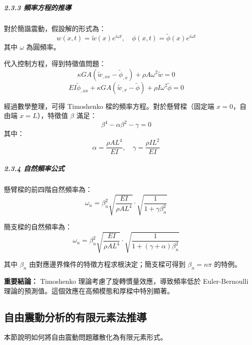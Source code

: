 ﻿\documentclass[UTF8, a4paper, 12pt]{ctexart}
\begin{document}
\subparagraph{2.3.3 頻率方程的推導}

對於簡諧震動，假設解的形式為：
\begin{equation}
  w(x,t) = \tilde{w}(x) e^{i\omega t}, \quad \phi(x,t) = \tilde{\phi}(x) e^{i\omega t}
\end{equation}
其中 $\omega$ 為圓頻率。

代入控制方程，得到特徵值問題：
\begin{equation}
  \kappa GA \left( \tilde{w}_{,xx} - \tilde{\phi}_{,x} \right) + \rho A \omega^2 \tilde{w} = 0
\end{equation}
\begin{equation}
  EI \tilde{\phi}_{,xx} + \kappa GA (\tilde{w}_{,x} - \tilde{\phi}) + \rho I \omega^2 \tilde{\phi} = 0
\end{equation}

經過數學整理，可得 Timoshenko 樑的頻率方程。對於懸臂樑（固定端 $x=0$，自由端 $x=L$），特徵值 $\beta$ 滿足：
\begin{equation}
  \beta^4 - \alpha \beta^2 - \gamma = 0
\end{equation}
其中：
\begin{equation}
  \alpha = \frac{\rho A L^4}{EI}, \quad \gamma = \frac{\rho I L^2}{EI}
\end{equation}

\subparagraph{2.3.4 自然頻率公式}

懸臂樑的前四階自然頻率為：
\begin{equation}
  \omega_n = \beta_n^2 \sqrt{\frac{EI}{\rho A L^4}} \cdot \sqrt{\frac{1}{1 + \gamma \beta_n^2}}
\end{equation}

簡支樑的自然頻率為：
\begin{equation}
  \omega_n = \beta_n^2 \sqrt{\frac{EI}{\rho A L^4}} \cdot \sqrt{\frac{1}{1 + (\gamma + \alpha)\beta_n^2}}
\end{equation}

其中 $\beta_n$ 由對應邊界條件的特徵方程求根決定；簡支樑可得到 $\beta_n=n\pi$ 的特例。

\textbf{重要結論：} Timoshenko 理論考慮了旋轉慣量效應，導致頻率低於 Euler-Bernoulli 理論的預測值。這個效應在高頻模態和厚樑中特別顯著。

\subsection{自由震動分析的有限元素法推導}

本節說明如何將自由震動問題離散化為有限元素形式。
\end{document}
